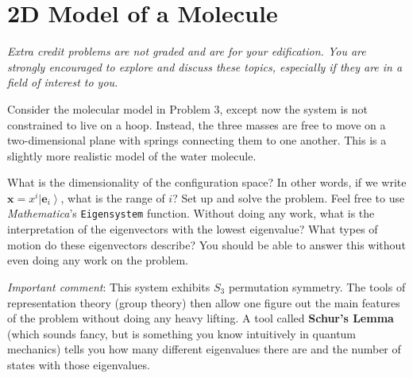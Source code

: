 \documentclass[12pt]{article}
\numberwithin{equation}{section}    %
\renewcommand{\vec}[1]{\mathbf{#1}} %
\begin{document}
\section{2D Model of a Molecule}

\emph{Extra credit problems are not graded and are for your edification. You are strongly encouraged to explore and discuss these topics, especially if they are in a field of interest to you.}

Consider the molecular model in Problem 3, except now the system is not constrained to live on a hoop. Instead, the three masses are free to move on a two-dimensional plane with springs connecting them to one another. This is a slightly more realistic model of the water molecule. 

What is the dimensionality of the configuration space? In other words, if we write $\vec{x} = x^i \left|\vec{e}_i\right\rangle$, what is the range of $i$? Set up and solve the problem. Feel free to use \emph{Mathematica}'s \texttt{Eigensystem} function. Without doing any work, what is the interpretation of the eigenvectors with the lowest eigenvalue? What types of motion do these eigenvectors describe? You should be able to answer this without even doing any work on the problem.

\emph{Important comment}: This system exhibits $S_3$ permutation symmetry. The tools of representation theory (group theory) then allow one figure out the main features of the problem without doing any heavy lifting. A tool called \textbf{Schur's Lemma} (which sounds fancy, but is something you know intuitively in quantum mechanics) tells you how many different eigenvalues there are and the number of states with those eigenvalues. 



\end{document}

